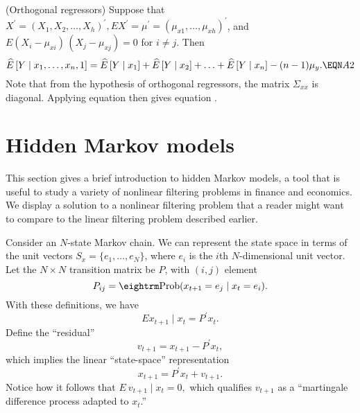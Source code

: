  \quad (Orthogonal regressors)
\medskip \noindent
 Suppose that\hfil\break
$X^\prime = (X_1, X_2, \ldots, X_h)^\prime, EX^\prime= \mu^\prime = (\mu_{x1},
\ldots, \mu_{xh})^\prime$, and $E (X_i - \mu_{xi})\, (X_j-\mu_{xj}) = 0$
for $i \not= j$.  Then
$$\widehat E \, [Y \mid x_1,\ldots, x_n, 1] = \widehat E\,[Y \mid x_1]+\widehat
E\,[Y\mid x_2] + \ldots + \widehat E\, [Y\mid x_n]-(n-1) \mu_y . \EQN A2$$
\endtheorem
\medskip\noindent
\proof Note that from the hypothesis of orthogonal regressors, the
matrix $\Sigma_{xx}$ is diagonal.  Applying equation
 then gives equation . \endproof %
{}
\section{Hidden Markov models}\label{sec:HMM}%
This section gives a brief introduction to hidden Markov models,
a tool that is useful to study a variety of nonlinear filtering
problems in finance and economics.  We display a solution to
a nonlinear filtering problem that a reader might want
to compare to the linear filtering problem described earlier.

    Consider an $N$-state Markov chain.   We can represent the
state space in terms of the unit vectors
$S_x = \{e_1,\ldots, e_N\}$, where $e_i$  is the $i$th
 $N$-dimensional unit vector.  Let the $N \times N$ transition
matrix be $P$, with $(i,j)$ element
$$P_{ij} = {\rm Prob}(x_{t+1} = e_j\mid x_t = e_i).$$
With these definitions, we have
$$E x_{t+1} \mid x_t = P^\prime x_t.$$
%
Define the ``residual''
$$v_{t+1} = x_{t+1} - P^\prime x_t,$$
which implies the linear ``state-space'' representation
$$x_{t+1} = P^\prime x_t + v_{t+1}.$$
Notice how it follows that
$E \ v_{t+1} \mid x_t = 0 ,$ which qualifies $v_{t+1}$ as a ``martingale
difference process adapted to $x_t$.''%

